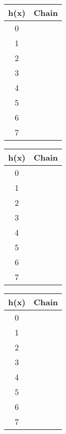 \vspace{0.5cm}
\begin{tabular}{|c|c|}
\hline
h(x) & Chain \\ \hline\hline
0 & \hspace{3cm} \\ \hline
1 & \hspace{3cm} \\ \hline
2 & \hspace{3cm} \\ \hline
3 & \hspace{3cm} \\ \hline
4 & \hspace{3cm} \\ \hline
5 & \hspace{3cm} \\ \hline
6 & \hspace{3cm} \\ \hline
7 & \hspace{3cm} \\ \hline
\end{tabular}
\begin{tabular}{|c|c|}
\hline
h(x) & Chain \\ \hline\hline
0 & \hspace{3cm} \\ \hline
1 & \hspace{3cm} \\ \hline
2 & \hspace{3cm} \\ \hline
3 & \hspace{3cm} \\ \hline
4 & \hspace{3cm} \\ \hline
5 & \hspace{3cm} \\ \hline
6 & \hspace{3cm} \\ \hline
7 & \hspace{3cm} \\ \hline
\end{tabular}
\begin{tabular}{|c|c|}
\hline
h(x) & Chain \\ \hline\hline
0 & \hspace{3cm} \\ \hline
1 & \hspace{3cm} \\ \hline
2 & \hspace{3cm} \\ \hline
3 & \hspace{3cm} \\ \hline
4 & \hspace{3cm} \\ \hline
5 & \hspace{3cm} \\ \hline
6 & \hspace{3cm} \\ \hline
7 & \hspace{3cm} \\ \hline
\end{tabular}

